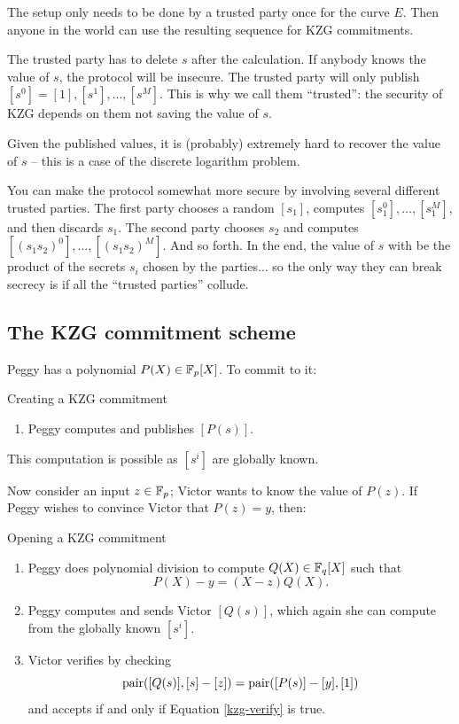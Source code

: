 The setup only needs to be done by a trusted party once for the curve
$E$. Then anyone in the world can use the resulting sequence for KZG
commitments.

\begin{remark}{}{}
The trusted party has to delete $s$ after the calculation.
If anybody knows the value of $s$, the protocol will be insecure.
The trusted party will only publish $[s^0] = [1], [s^1], \ldots, [s^M]$.
This is why we call them ``trusted'': the security of KZG
depends on them not saving the value of $s$.

Given the published values, it is (probably) extremely hard to recover the value of $s$ --
this is a case of the discrete logarithm problem.

You can make the protocol somewhat more secure by involving
several different trusted parties.
The first party chooses a random $[s_1]$,
computes $[s_1^0], \ldots, [s_1^M]$,
and then discards $s_1$.
The second party chooses $s_2$ and computes $[(s_1 s_2)^0], \ldots, [(s_1 s_2)^M]$.
And so forth.
In the end, the value of $s$ with be the product of the secrets
$s_i$ chosen by the parties... so the only way they can break secrecy
is if all the ``trusted parties'' collude.
\end{remark}

\subsection{The KZG commitment scheme}

Peggy has a polynomial $P(X) \in \mathbb{F}_{p}[X]$. To
commit to it:

\begin{algo}{Creating a KZG commitment}{}
\begin{enumerate}
\item
  Peggy computes and publishes $[P(s)]$.
\end{enumerate}
\end{algo}

This computation is possible as $[s^i]$ are
globally known.

Now consider an input $z \in \mathbb{F}_{p}$; Victor wants to know the
value of $P(z)$. If Peggy wishes to convince Victor that $P(z) = y$,
then:

\begin{algo}{Opening a KZG commitment}{}
\begin{enumerate}
\item
  Peggy does polynomial division to compute
  $Q(X) \in \mathbb{F}_{q}[X]$ such that
  \[P(X) - y = (X - z)Q(X).\]
\item
  Peggy computes and sends Victor $[Q(s)]$,
  which again she can compute from the globally known
  $[s^i]$.
\item
  Victor verifies by checking
\begin{equation}
\label{kzg-verify}
\operatorname{pair}([Q(s)], [s] - [z]) = \operatorname{pair}([P(s)] - [y], [1])
\end{equation}
and accepts if and only if Equation \eqref{kzg-verify} is true.
\end{enumerate}
\end{algo}

